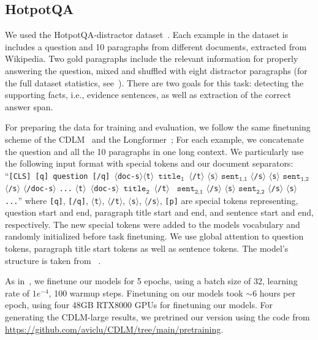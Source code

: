 \subsection{HotpotQA}
\label{subsec:hotpotqa}
We used the HotpotQA-distractor dataset~\cite{yang-etal-2018-hotpotqa}. Each example in the dataset is includes a question and 10 paragraphs from different documents, extracted from Wikipedia. Two gold paragraphs include the relevant information for properly answering the question, mixed and shuffled with eight distractor paragraphs (for the full dataset statistics, see~\citet{yang-etal-2018-hotpotqa}). There are two goals for this task: detecting the supporting facts, i.e., evidence sentences, as well as extraction of the correct answer span. 

For preparing the data for training and evaluation, we follow the same finetuning scheme of the CDLM~\cite{caciularu-etal-2021-cdlm-cross} and the Longformer~\cite{longformer}; For each example, we concatenate the question and all the 10 paragraphs in one long context. We particularly use the following input format with special tokens and our document separators: ``\texttt{[CLS] [q] question [/q] $\langle$\texttt{doc-s}$\rangle$$\langle$t$\rangle$ $\texttt{title}_{\texttt{1}}$ $\langle$/t$\rangle$} \texttt{$\langle$s$\rangle$} $\texttt{sent}_{\texttt{1,1}}$ \texttt{$\langle$/s$\rangle$} \texttt{$\langle$s$\rangle$} $\texttt{sent}_{\texttt{1,2}}$ \texttt{$\langle$/s$\rangle$} $\langle$\texttt{/doc-s}$\rangle$ \texttt{...} \texttt{$\langle$t$\rangle$ $\langle$\texttt{doc-s}$\rangle$ $\texttt{title}_{\texttt{2}}$ $\langle$/t$\rangle$ }  $\texttt{sent}_{\texttt{2,1}}$ \texttt{$\langle$/s$\rangle$} \texttt{$\langle$s$\rangle$} $\texttt{sent}_{\texttt{2,2}}$ \texttt{$\langle$/s$\rangle$} \texttt{$\langle$s$\rangle$} \texttt{...}'' where \texttt{[q]}, \texttt{[/q]}, $\langle$\texttt{t}$\rangle$, $\langle$\texttt{/t}$\rangle$, \texttt{$\langle$s$\rangle$}, \texttt{$\langle$/s$\rangle$}, \texttt{[p]} are special tokens representing, question start and end, paragraph title start and end, and sentence start and end, respectively. The new special tokens were added to the models vocabulary and randomly initialized before task finetuning. We use global attention to question tokens, paragraph title start tokens as well as sentence tokens. 
The model's structure is taken from ~\citet{longformer}.

As in~\citet{longformer,caciularu-etal-2021-cdlm-cross}, we finetune our models for 5 epochs, using a batch size of 32, learning rate of $1e^{-4}$, 100 warmup steps. Finetuning on our models took $\sim$6 hours per epoch, using four 48GB RTX8000 GPUs for finetuning our models. For generating the CDLM-large results, we pretrined our version using the code from \url{https://github.com/aviclu/CDLM/tree/main/pretraining}.


